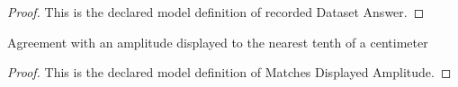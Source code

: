 \begin{proof}
  This is the declared model definition of recorded Dataset Answer.
\end{proof}
\begin{definition}
  \label{def:physics:phyx-mini-0305:phyxminiproblems-problemphyxmini0305-matchesdisplayedamplitude}
  Agreement with an amplitude displayed to the nearest tenth of a centimeter
\end{definition}
\begin{proof}
  This is the declared model definition of Matches Displayed Amplitude.
\end{proof}
